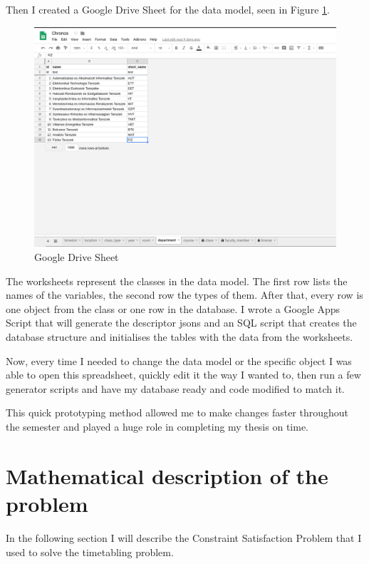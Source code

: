 Then I created a Google Drive Sheet for the data model, seen in Figure \ref{fig:GoogleDriveSheet}.

\begin{figure}[!ht]
\centering
\includegraphics[width=\linewidth, keepaspectratio]{figures/chronos_sheet.png}
\caption{Google Drive Sheet} 
\label{fig:GoogleDriveSheet}
\end{figure}

The worksheets represent the classes in the data model. The first row lists the names of the variables, the second row the types of them. After that, every row is one object from the class or one row in the database. I wrote a Google Apps Script that will generate the descriptor jsons and an SQL script that creates the database structure and initialises the tables with the data from the worksheets.

Now, every time I needed to change the data model or the specific object I was able to open this spreadsheet, quickly edit it the way I wanted to, then run a few generator scripts and have my database ready and code modified to match it.

This quick prototyping method allowed me to make changes faster throughout the semester and played a huge role in completing my thesis on time.

\section{Mathematical description of the problem}

In the following section I will describe the Constraint Satisfaction Problem that I used to solve the timetabling problem.

